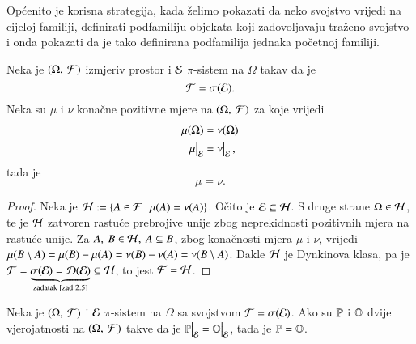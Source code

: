 \begin{nap} \label{nap:2.5-1}
    Op\' cenito je korisna strategija, kada \v zelimo pokazati da neko svojstvo vrijedi na cijeloj familiji, definirati podfamiliju objekata koji zadovoljavaju tra\v zeno svojstvo i onda pokazati da je tako definirana podfamilija jednaka po\v cetnoj familiji. 
\end{nap}


\begin{tm}  \label{tm:2.6}
    Neka je $(\Omega, \: \mathcal{F})$ izmjeriv prostor i $\mathcal{E}$ $\pi$-sistem na $\Omega$ takav da je
    \begin{equation*}
        \mathcal{F} = \sigma({\mathcal{E}}).
    \end{equation*}
    Neka su $\mu$ i $\nu$ kona\v cne pozitivne mjere na $(\Omega, \: \mathcal{F})$ za koje vrijedi
    \begin{equation*}
        \begin{aligned}
            \mjera{\Omega} &= \nu(\Omega)\\
            \restr{\mu}{\famE} &= \restr{\nu}{\famE},
        \end{aligned}
    \end{equation*}
    tada je
    \begin{equation*}
        \mu = \nu.
    \end{equation*}   
\end{tm}

\begin{proof}
    Neka je $\mathcal{H} := \{{A \in \mathcal{F}} \: | \: {\mu({A}) = \nu(A)}\}$.
    O\v cito je $\mathcal{E} \subseteq \mathcal{H}$. S druge strane $\Omega \in \mathcal{H}$, te je $\mathcal{H}$ zatvoren rastu\' ce prebrojive unije zbog neprekidnosti pozitivnih mjera na rastu\' ce unije.
    Za $A, \: B \in \mathcal{H}, \: A \subseteq B$, zbog kona\v cnosti mjera $\mu$ i $\nu$, vrijedi $\mu({B \setminus A}) = \mu({B}) - \mu({A}) = \nu(B) - \nu(A) = \nu(B \setminus A)$.
    Dakle $\mathcal{H}$ je Dynkinova klasa, pa je $\mathcal{F} = \underbrace{\sigma({\mathcal{E}}) = \mathcal{D}({\mathcal{E}})}_{\textnormal{zadatak \ref{zad:2.5}}} \subseteq \mathcal{H}$, to jest $\mathcal{F} = \mathcal{H}$.
\end{proof}

\begin{kor} \label{kor:2.7}
    Neka je $(\Omega, \: \mathcal{F})$ i $\mathcal{E}$ $\pi$-sistem na $\Omega$ sa svojstvom $\mathcal{F} = \sigma({\mathcal{E}})$.
    Ako su $\mathbb{P}$ i $\mathbb{O}$ dvije vjerojatnosti na $(\Omega, \: \mathcal{F})$ takve da je $\restr{\masP}{\famE} = \restr{\masO}{\famE}$, tada je $\mathbb{P}
    = \mathbb{O}$.
\end{kor}

